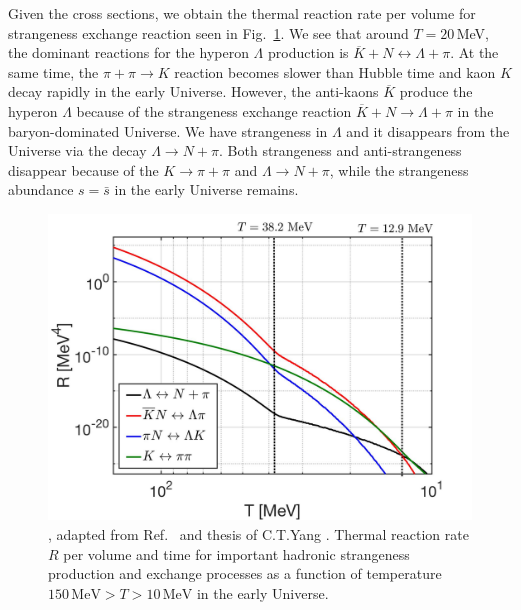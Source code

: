 Given the cross sections, we obtain the thermal reaction rate per volume for strangeness exchange reaction seen in Fig.~\ref{Lambda_Rate_volume.fig}. We see that around $T=20$\,MeV, the dominant reactions for the hyperon $\Lambda$ production is $\overline{K}+N\leftrightarrow\Lambda+\pi$. At the same time, the $\pi+\pi\to K$ reaction becomes slower than Hubble time and kaon $K$ decay rapidly in the early Universe. However, the anti-kaons $\overline K$ produce the hyperon $\Lambda$ because of the strangeness exchange reaction $\overline{K}+N\rightarrow\Lambda+\pi$ in the baryon-dominated Universe. We have strangeness in $\Lambda$ and it disappears from the Universe via the decay $\Lambda\rightarrow N+\pi$. Both strangeness and anti-strangeness disappear because of the $K\rightarrow\pi+\pi$ and $\Lambda\rightarrow N+\pi$, while the strangeness abundance $s = \bar{s}$ in the early Universe remains.

\begin{figure}[ht]
\centering
\includegraphics[width=0.9\linewidth]{./plots/NewHyperonRate_C.jpg}
\caption{, adapted from Ref.~\cite{Yang:2021bko} and thesis of C.T.Yang \cite{Yang:2024ret}. Thermal reaction rate $R$ per volume and time for important hadronic strangeness production and exchange processes as a function of temperature $150\,\mathrm{MeV}> T>10\,\mathrm{MeV}$ in the early Universe.}
\label{Lambda_Rate_volume.fig}
\end{figure}

